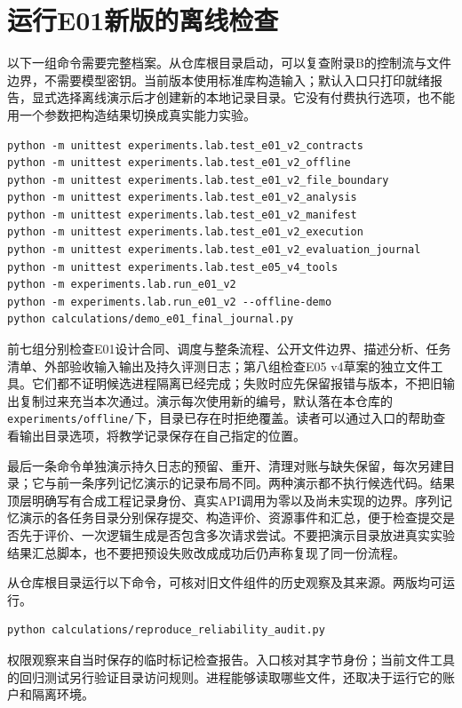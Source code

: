 \section{运行E01新版的离线检查}

以下一组命令需要完整档案。从仓库根目录启动，可以复查附录B的控制流与文件边界，不需要模型密钥。当前版本使用标准库构造输入；默认入口只打印就绪报告，显式选择离线演示后才创建新的本地记录目录。它没有付费执行选项，也不能用一个参数把构造结果切换成真实能力实验。

\begin{verbatim}
python -m unittest experiments.lab.test_e01_v2_contracts
python -m unittest experiments.lab.test_e01_v2_offline
python -m unittest experiments.lab.test_e01_v2_file_boundary
python -m unittest experiments.lab.test_e01_v2_analysis
python -m unittest experiments.lab.test_e01_v2_manifest
python -m unittest experiments.lab.test_e01_v2_execution
python -m unittest experiments.lab.test_e01_v2_evaluation_journal
python -m unittest experiments.lab.test_e05_v4_tools
python -m experiments.lab.run_e01_v2
python -m experiments.lab.run_e01_v2 --offline-demo
python calculations/demo_e01_final_journal.py
\end{verbatim}

前七组分别检查E01设计合同、调度与整条流程、公开文件边界、描述分析、任务清单、外部验收输入输出及持久评测日志；第八组检查E05 v4草案的独立文件工具。它们都不证明候选进程隔离已经完成；失败时应先保留报错与版本，不把旧输出复制过来充当本次通过。演示每次使用新的编号，默认落在本仓库的\nolinkurl{experiments/offline/}下，目录已存在时拒绝覆盖。读者可以通过入口的帮助查看输出目录选项，将教学记录保存在自己指定的位置。

最后一条命令单独演示持久日志的预留、重开、清理对账与缺失保留，每次另建目录；它与前一条序列记忆演示的记录布局不同。两种演示都不执行候选代码。结果顶层明确写有合成工程记录身份、真实API调用为零以及尚未实现的边界。序列记忆演示的各任务目录分别保存提交、构造评价、资源事件和汇总，便于检查提交是否先于评价、一次逻辑生成是否包含多次请求尝试。不要把演示目录放进真实实验结果汇总脚本，也不要把预设失败改成成功后仍声称复现了同一份流程。

\begin{sloppypar}
\begin{samepage}
从仓库根目录运行以下命令，可核对旧文件组件的历史观察及其来源。两版均可运行。
\begin{verbatim}
python calculations/reproduce_reliability_audit.py
\end{verbatim}
\end{samepage}
权限观察来自当时保存的临时标记检查报告。入口核对其字节身份；当前文件工具的回归测试另行验证目录访问规则。进程能够读取哪些文件，还取决于运行它的账户和隔离环境。
\end{sloppypar}

